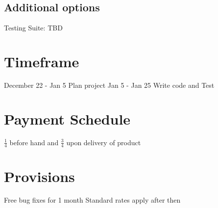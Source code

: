 \documentclass[dvips,12pt]{article}
\begin{document}
\subsection{Additional options}
Testing Suite: TBD

\section{Timeframe}
December 22 - Jan 5 Plan project
Jan 5 - Jan 25 Write code and Test


\section{Payment Schedule}
$\frac{1}{4}$ before hand and $\frac{3}{4}$ upon delivery of product

 
\section{Provisions}
Free bug fixes for 1 month
Standard rates apply after then
\end{document}
